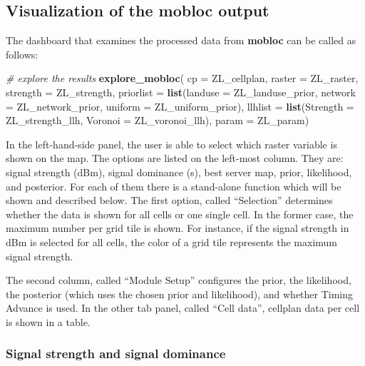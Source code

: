 \documentclass[
]{article}
\newenvironment{Shaded}{\begin{snugshade}}{\end{snugshade}}
\newcommand{\CommentTok}[1]{\textcolor[rgb]{0.56,0.35,0.01}{\textit{#1}}}
\newcommand{\DataTypeTok}[1]{\textcolor[rgb]{0.13,0.29,0.53}{#1}}
\newcommand{\KeywordTok}[1]{\textcolor[rgb]{0.13,0.29,0.53}{\textbf{#1}}}
\newcommand{\NormalTok}[1]{#1}
\begin{document}
\hypertarget{visualization-of-the-mobloc-output}{%
\subsection{Visualization of the mobloc
output}\label{visualization-of-the-mobloc-output}}

The dashboard that examines the processed data from \textbf{mobloc} can
be called as follows:

\begin{Shaded}
\begin{Highlighting}[]
\CommentTok{# explore the results}
\KeywordTok{explore_mobloc}\NormalTok{(}
    \DataTypeTok{cp =}\NormalTok{ ZL_cellplan, }
    \DataTypeTok{raster =}\NormalTok{ ZL_raster, }
    \DataTypeTok{strength =}\NormalTok{ ZL_strength,}
    \DataTypeTok{priorlist =} \KeywordTok{list}\NormalTok{(}\DataTypeTok{landuse =}\NormalTok{ ZL_landuse_prior, }\DataTypeTok{network =}\NormalTok{ ZL_network_prior, }\DataTypeTok{uniform =}\NormalTok{ ZL_uniform_prior),}
    \DataTypeTok{llhlist =} \KeywordTok{list}\NormalTok{(}\DataTypeTok{Strength =}\NormalTok{ ZL_strength_llh, }\DataTypeTok{Voronoi =}\NormalTok{ ZL_voronoi_llh),}
    \DataTypeTok{param =}\NormalTok{ ZL_param)}
\end{Highlighting}
\end{Shaded}

In the left-hand-side panel, the user is able to select which raster
variable is shown on the map. The options are listed on the left-most
column. They are: signal strength (dBm), signal dominance (s), best
server map, prior, likelihood, and posterior. For each of them there is
a stand-alone function which will be shown and described below. The
first option, called ``Selection'' determines whether the data is shown
for all cells or one single cell. In the former case, the maximum number
per grid tile is shown. For instance, if the signal strength in dBm is
selected for all cells, the color of a grid tile represents the maximum
signal strength.

The second column, called ``Module Setup'' configures the prior, the
likelihood, the posterior (which uses the chosen prior and likelihood),
and whether Timing Advance is used. In the other tab panel, called
``Cell data'', cellplan data per cell is shown in a table.

\hypertarget{signal-strength-and-signal-dominance}{%
\subsubsection{Signal strength and signal
dominance}\label{signal-strength-and-signal-dominance}}
\end{document}
